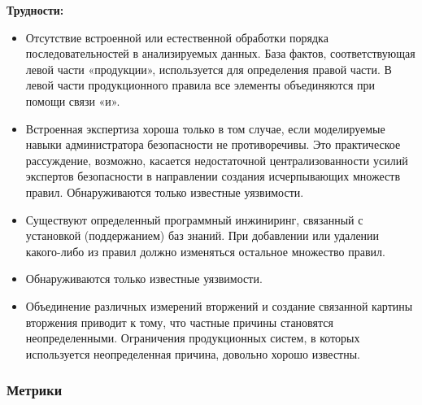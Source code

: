 \textbf{Трудности:}
\begin{itemize}
    \item Отсутствие встроенной или естественной обработки порядка последовательностей в анализируемых
    данных. База фактов, соответствующая левой части «продукции», используется для определения правой
    части. В левой части продукционного правила все элементы объединяются при помощи связи «и».
    \item Встроенная экспертиза хороша только в том случае, если моделируемые навыки администратора
    безопасности не противоречивы. Это практическое рассуждение, возможно, касается
    недостаточной централизованности усилий экспертов безопасности в направлении создания
    исчерпывающих множеств правил. Обнаруживаются только известные уязвимости.
    \item Существуют определенный программный инжиниринг, связанный с установкой (поддержанием) баз знаний.
    При добавлении или удалении какого-либо из правил должно изменяться остальное множество правил.
    \item Обнаруживаются только известные уязвимости.
    \item Объединение различных измерений вторжений и создание связанной картины вторжения приводит к
    тому, что частные причины становятся неопределенными. Ограничения продукционных систем, в
    которых используется неопределенная причина, довольно хорошо известны.
\end{itemize}
\autocite{BeynonDavies}



\subsubsection{Метрики}

